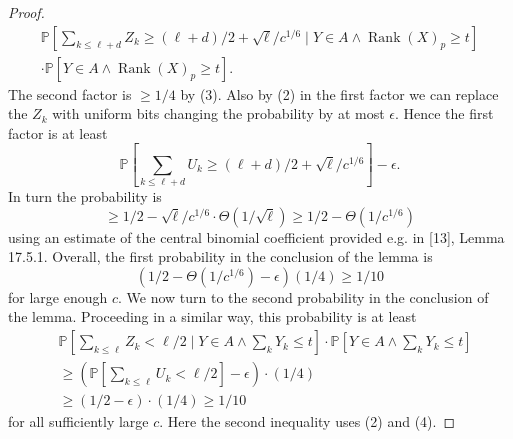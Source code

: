 \begin{proof}
\begin{multline*}
\mathbb P\left[\sum_{k\leq\ell+d}Z_k\geq(\ell+d)/2+\sqrt\ell/c^{1/6}\mid Y\in A\wedge\operatorname{Rank}(X)_p\geq t\right]\\
\cdot\mathbb P[Y\in A\wedge\operatorname{Rank}(X)_p\geq t].
\end{multline*}
The second factor is $\geq1/4$ by (3). Also by (2) in the first factor we can replace the $Z_k$ with uniform bits changing the probability by at most $\epsilon$. Hence the first factor is at least
\[\mathbb P\left[\sum_{k\leq\ell+d}U_k\geq(\ell+d)/2+\sqrt\ell/c^{1/6}\right]-\epsilon.\]
In turn the probability is
\[\geq1/2-\sqrt\ell/c^{1/6}\cdot\Theta(1/\sqrt\ell)\geq1/2-\Theta(1/c^{1/6})\]
using an estimate of the central binomial coefficient provided e.g. in [13], Lemma 17.5.1.
Overall, the first probability in the conclusion of the lemma is
\[(1/2-\Theta(1/c^{1/6})-\epsilon)(1/4)\geq1/10\]
for large enough $c$.
We now turn to the second probability in the conclusion of the lemma. Proceeding in a similar way, this probability is at least
\begin{align*}
&\mathbb P\left[\sum_{k\leq\ell}Z_k<\ell/2\mid Y\in A\wedge\sum_kY_k\leq t\right]\cdot\mathbb P\left[Y\in A\wedge\sum_kY_k\leq t\right]\\
&\geq\left(\mathbb P\left[\sum_{k\leq\ell}U_k<\ell/2\right]-\epsilon\right)\cdot(1/4)\\
&\geq(1/2-\epsilon)\cdot(1/4)\geq1/10
\end{align*}
for all sufficiently large $c$. Here the second inequality uses (2) and (4).
\end{proof}
